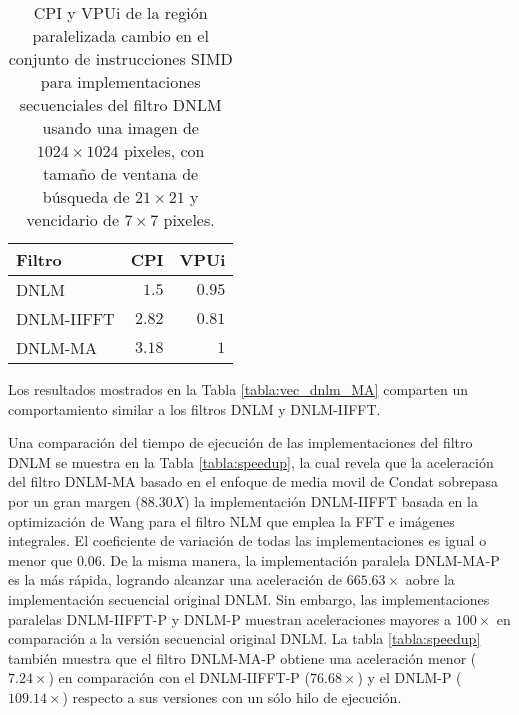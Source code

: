 \begin{table}
\protect\caption[M\'etricas CPI y VPUi de los filtros con 1 hilo]{CPI y VPUi de  la regi\'on paralelizada cambio en el conjunto de instrucciones SIMD para implementaciones secuenciales del filtro DNLM usando una imagen de  $1024 \times 1024$ pixeles, con tama\~no de ventana de b\'usqueda de $21 \times 21$ y vencidario de $7 \times 7$ pixeles. \label{tabla:vpui}}
\centering
\begin{tabular}{lrr}
Filtro  & CPI & VPUi \tabularnewline
\hline
DNLM & $1.5$ & $0.95$\tabularnewline
DNLM-IIFFT &$2.82$ & $0.81$  \tabularnewline
DNLM-MA &$3.18$&  $1$  \tabularnewline
\end{tabular}
\end{table}

Los resultados mostrados en la Tabla \ref{tabla:vec_dnlm_MA} comparten un comportamiento similar a los filtros DNLM y DNLM-IIFFT. 



Una comparaci\'on del tiempo de ejecuci\'on de las implementaciones del filtro DNLM se muestra en la Tabla \ref{tabla:speedup}, la cual revela que la aceleraci\'on del filtro DNLM-MA basado en el enfoque de media movil de Condat \cite{Condat2010} sobrepasa por un gran margen ($88.30X$) la implementaci\'on DNLM-IIFFT \cite{CalderonRamirez2017} basada en la optimizaci\'on de Wang para el filtro NLM \cite{wang2006fast} que emplea la FFT e im\'agenes integrales. El coeficiente de variaci\'on de todas las implementaciones es igual o menor que $0.06$. 
De la misma manera, la implementaci\'on paralela DNLM-MA-P es la m\'as r\'apida, logrando alcanzar una aceleraci\'on de $665.63\times$ aobre la implementaci\'on secuencial original DNLM. Sin embargo, las implementaciones paralelas DNLM-IIFFT-P y DNLM-P muestran aceleraciones mayores a $100\times$ en comparaci\'on a la versi\'on secuencial original DNLM.
La tabla \ref{tabla:speedup} tambi\'en muestra que el filtro DNLM-MA-P obtiene una aceleraci\'on menor ($7.24\times$) en comparaci\'on con el DNLM-IIFFT-P ($76.68\times$) y el DNLM-P ($109.14\times$) respecto a sus versiones con un s\'olo hilo de ejecuci\'on.



